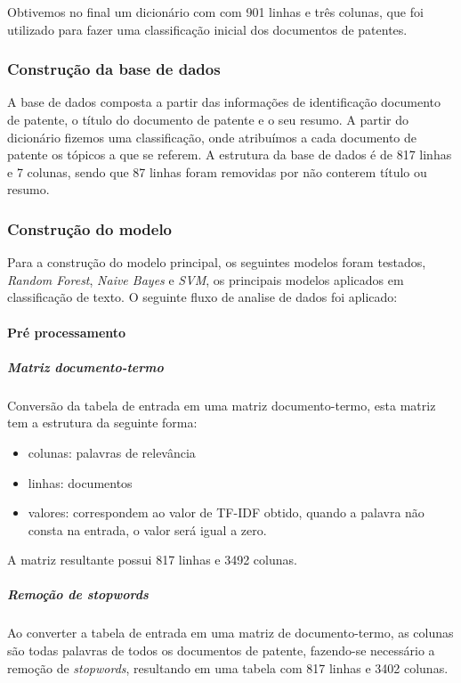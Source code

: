 Obtivemos no final um dicionário com com 901 linhas e três colunas, que foi utilizado para fazer uma classificação inicial dos documentos de patentes. 

\subsubsection{Construção da base de dados}

A base de dados composta a partir das informações de identificação documento de patente, o título do documento de patente e o seu resumo. A partir do dicionário fizemos uma classificação, onde atribuímos a cada documento de patente os tópicos a que se referem. A estrutura da base de dados é de 817 linhas e 7 colunas, sendo que 87 linhas foram removidas por não conterem título ou resumo.

\subsubsection{Construção do modelo}

Para a construção do modelo principal, os seguintes modelos foram testados, \textit{Random Forest}, \textit{Naive Bayes} e \textit{SVM}, os principais modelos aplicados em classificação de texto. O seguinte fluxo de analise de dados foi aplicado:

\paragraph{Pré processamento}

\subparagraph{Matriz documento-termo}

Conversão da tabela de entrada em uma matriz documento-termo, esta matriz tem a estrutura da seguinte forma:

\begin{itemize}
  \item colunas: palavras de relevância
  \item linhas: documentos
  \item valores: correspondem ao valor de TF-IDF obtido, quando a palavra não consta na entrada, o valor será igual a zero.
\end{itemize}

A matriz resultante possui 817 linhas e 3492 colunas.
	
\subparagraph{Remoção de \textit{stopwords}}

Ao converter a tabela de entrada em uma matriz de documento-termo, as colunas são todas palavras de todos os documentos de patente, fazendo-se necessário a remoção de \textit{stopwords}, resultando em uma tabela com 817 linhas e 3402 colunas.

